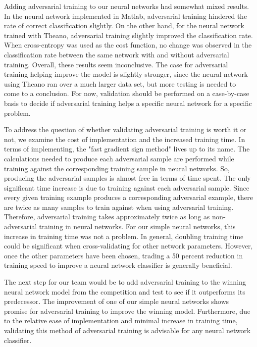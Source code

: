 \documentclass          {article} %
\begin{document}
Adding adversarial training to our neural networks had somewhat mixed results. In the neural network implemented in Matlab, adversarial training hindered the rate of correct classification slightly. On the other hand, for the neural network trained with Theano, adversarial training slightly improved the classification rate. When cross-entropy was used as the cost function, no change was observed in the classification rate between the same network with and without adversarial training. Overall, these results seem inconclusive. The case for adversarial training helping improve the model is slightly stronger, since the neural network using Theano ran over a much larger data set, but more testing is needed to come to a conclusion. For now, validation should be performed on a case-by-case basis to decide if adversarial training helps a specific neural network for a specific problem.

To address the question of whether validating adversarial training is worth it or not, we examine the cost of implementation and the increased training time. In terms of implementing, the "fast gradient sign method" lives up to its name. The calculations needed to produce each adversarial sample are performed while training against the corresponding training sample in neural networks. So, producing the adversarial samples is almost free in terms of time spent. The only significant time increase is due to training against each adversarial sample. Since every given training example produces a corresponding adversarial example, there are twice as many samples to train against when using adversarial training. Therefore, adversarial training takes approximately twice as long as non-adversarial training in neural networks. For our simple neural networks, this increase in training time was not a problem. In general, doubling training time could be significant when cross-validating for other network parameters. However, once the other parameters have been chosen, trading a 50 percent reduction in training speed to improve a neural network classifier is generally beneficial.

The next step for our team would be to add adversarial training to the winning neural network model from the competition and test to see if it outperforms its predecessor. The improvement of one of our simple neural networks shows promise for adversarial training to improve the winning model. Furthermore, due to the relative ease of implementation and minimal increase in training time, validating this method of adversarial training is advisable for any neural network classifier.
\end{document}
